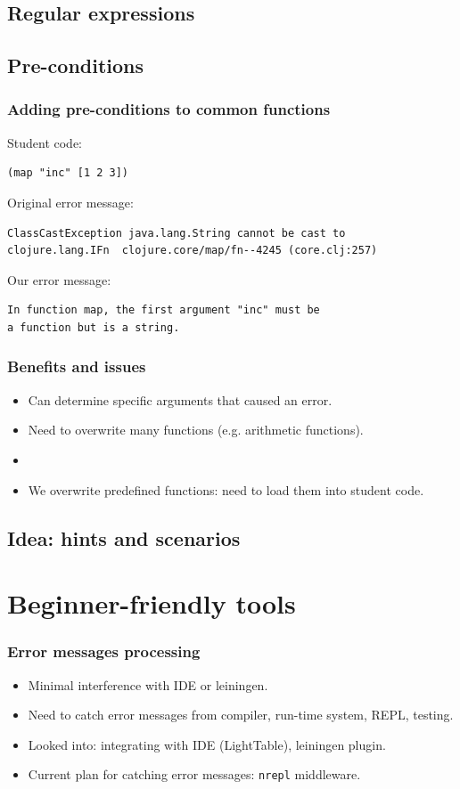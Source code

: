\documentclass{beamer}
\begin{document}
\subsection{Regular expressions}

\subsection{Pre-conditions}
\begin{frame}[fragile]
   \frametitle {Adding pre-conditions to common functions }
Student code:
\begin{verbatim}
(map "inc" [1 2 3])
\end{verbatim} 

Original error message:
\begin{verbatim}
ClassCastException java.lang.String cannot be cast to
clojure.lang.IFn  clojure.core/map/fn--4245 (core.clj:257)
\end{verbatim} 

Our error message: 
\begin{verbatim}
In function map, the first argument "inc" must be
a function but is a string.
\end{verbatim}
\end{frame}

\begin{frame}
 \frametitle {Benefits and issues}
\begin{itemize}
\item Can determine specific arguments that caused an error. 
\item Need to overwrite many functions (e.g. arithmetic functions).
\item 
\item We overwrite predefined functions: need to load them into student code. 
\end{itemize}
\end{frame}

\subsection{Idea: hints and scenarios}

\section{Beginner-friendly tools}

\begin{frame}
   \frametitle{Error messages processing}
\begin{itemize}
\item Minimal interference with IDE or leiningen.
\item Need to catch error messages from compiler,  run-time system, REPL, testing.
\item Looked into: integrating with IDE (LightTable), leiningen plugin. 
\item Current plan for catching error messages: {\tt nrepl} middleware. 
\end{itemize}
\end{frame}
\end{document}
